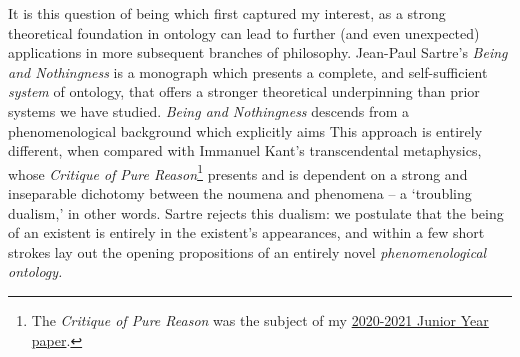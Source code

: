 It is this question of being which first captured my interest, as a strong theoretical foundation in ontology can lead to further (and even unexpected) applications in more subsequent branches of philosophy. Jean-Paul Sartre's \emph{Being and Nothingness} is a monograph which presents a complete, and self-sufficient \emph{system} of ontology, that offers a stronger theoretical underpinning than prior systems we have studied. \emph{Being and Nothingness} descends from a phenomenological background which explicitly aims  This approach is entirely different, when compared with Immanuel Kant's transcendental metaphysics, whose \emph{Critique of Pure Reason}\footnote{The \emph{Critique of Pure Reason} was the subject of my \href{https://github.com/ShenZhouHong/kant-metaphysics}{2020-2021 Junior Year paper}.} presents and is dependent on a strong and inseparable dichotomy between the noumena and phenomena -- a \enquote*{troubling dualism,} in other words. Sartre rejects this dualism: we postulate that the being of an existent is entirely in the existent's appearances, and within a few short strokes lay out the opening propositions of an entirely novel \emph{phenomenological ontology.}


